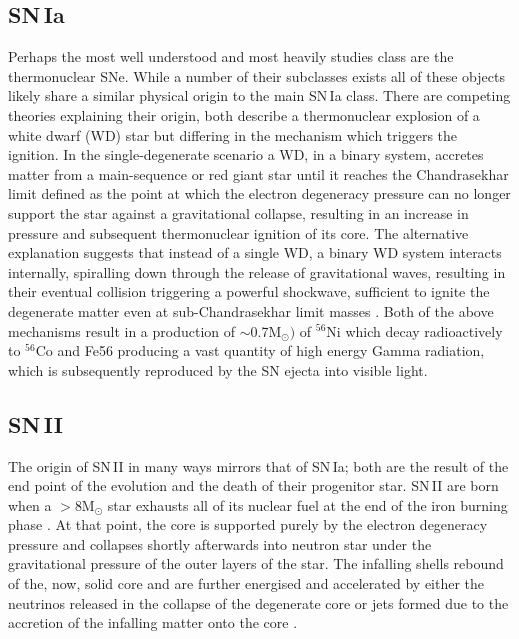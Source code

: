 \subsection{SN\,Ia}
Perhaps the most well understood and most heavily studies class are the thermonuclear SNe. While a number of their subclasses exists \citep[amongst others: SN\,.Ia, SN\'Iax, SN\,Ia-91T, SN\,Ia-91bg][]{Alsabti2017} all of these objects likely share a similar physical origin to the main SN\,Ia class. There are competing theories explaining their origin, both describe a thermonuclear explosion of a white dwarf (WD) star but differing in the mechanism which triggers the ignition. In the single-degenerate scenario \citep{Whelan1973} a WD, in a binary system, accretes matter from a main-sequence or red giant star until it reaches the Chandrasekhar limit defined as the point at which the electron degeneracy pressure can no longer support the star against a gravitational collapse, resulting in an increase in pressure and subsequent thermonuclear ignition of its core. The alternative explanation suggests that instead of a single WD, a binary WD system interacts internally, spiralling down through the release of gravitational waves, resulting in their eventual collision triggering a powerful shockwave, sufficient to ignite the degenerate matter even at sub-Chandrasekhar limit masses \citep{Iben1984}. Both of the above mechanisms result in a production of $\sim$0.7M$_\odot)$ of $^{56}$Ni \citep{Scalzo2014} which decay radioactively to $^{56}$Co and Fe56 producing a vast quantity of high energy Gamma radiation, which is subsequently reproduced by the SN ejecta into visible light.

\subsection{SN\,II}
The origin of SN\,II in many ways mirrors that of SN\,Ia; both are the result of the end point of the evolution and the death of their progenitor star. SN\,II are born when a $>$8M$_\odot$ star exhausts all of its nuclear fuel at the end of the iron burning phase \citep{Clayton1983}. At that point, the core is supported purely by the electron degeneracy pressure and collapses shortly afterwards into neutron star under the gravitational pressure of the outer layers of the star. The infalling shells rebound of the, now, solid core and are further energised and accelerated by either the neutrinos released in the collapse of the degenerate core \citep{Burrows1987} or jets formed due to the accretion of the infalling matter onto the core \citep{Khokhlov1999,Burrows2007}.

